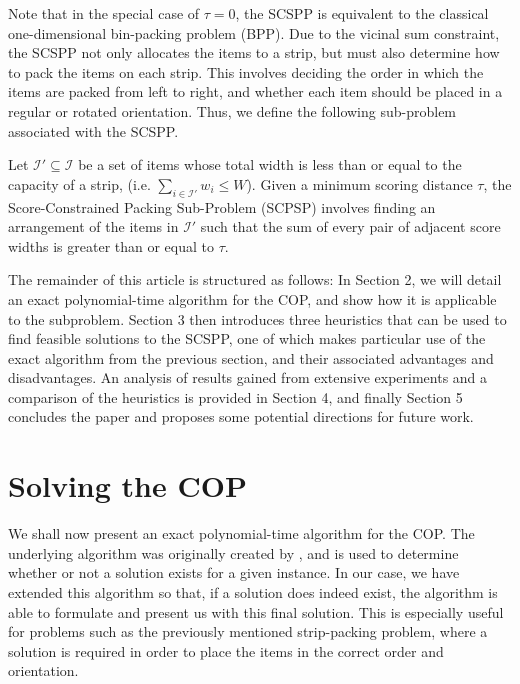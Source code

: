 \documentclass[oribibl]{llncs}
\begin{document}
Note that in the special case of $\tau = 0$, the SCSPP is equivalent to the classical one-dimensional bin-packing problem (BPP). Due to the vicinal sum constraint, the SCSPP not only allocates the items to a strip, but must also determine how to pack the items on each strip. This involves deciding the order in which the items are packed from left to right, and whether each item should be placed in a regular or rotated orientation. Thus, we define the following sub-problem associated with the SCSPP.

\begin{definition}
	\label{defn:subprob}
	Let $\mathcal{I}' \subseteq \mathcal{I}$ be a set of items whose total width is less than or equal to the capacity of a strip, (i.e. $\sum_{i\in \mathcal{I}'}w_i \leq W$). Given a minimum scoring distance $\tau$, the Score-Constrained Packing Sub-Problem (SCPSP) involves finding an arrangement of the items in $\mathcal{I}'$ such that the sum of every pair of adjacent score widths is greater than or equal to $\tau$.
\end{definition}


The remainder of this article is structured as follows: In Section 2, we will detail an exact polynomial-time algorithm for the COP, and show how it is applicable to the subproblem. Section 3 then introduces three heuristics that can be used to find feasible solutions to the SCSPP, one of which makes particular use of the exact algorithm from the previous section, and their associated advantages and disadvantages. An analysis of results gained from extensive experiments and a comparison of the heuristics is provided in Section 4, and finally Section 5 concludes the paper and proposes some potential directions for future work.

\section{Solving the COP}
\label{sec:ahca}
We shall now present an exact polynomial-time algorithm for the COP. The underlying algorithm was originally created by \cite{becker2010}, and is used to determine whether or not a solution exists for a given instance. In our case, we have extended this algorithm so that, if a solution does indeed exist, the algorithm is able to formulate and present us with this final solution. This is especially useful for problems such as the previously mentioned strip-packing problem, where a solution is required in order to place the items in the correct order and orientation.
\end{document}
